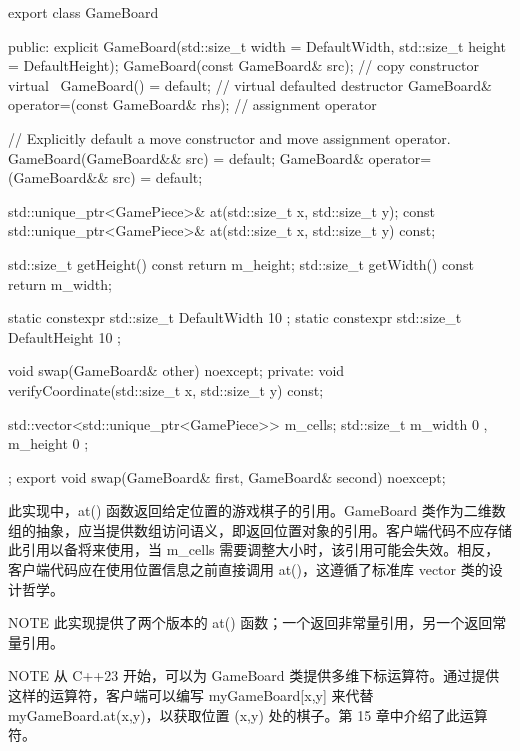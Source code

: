 \begin{cpp}
export class GameBoard
{
    public:
        explicit GameBoard(std::size_t width = DefaultWidth,
            std::size_t height = DefaultHeight);
        GameBoard(const GameBoard& src); // copy constructor
        virtual ~GameBoard() = default; // virtual defaulted destructor
        GameBoard& operator=(const GameBoard& rhs); // assignment operator

        // Explicitly default a move constructor and move assignment operator.
        GameBoard(GameBoard&& src) = default;
        GameBoard& operator=(GameBoard&& src) = default;

        std::unique_ptr<GamePiece>& at(std::size_t x, std::size_t y);
        const std::unique_ptr<GamePiece>& at(std::size_t x, std::size_t y) const;

        std::size_t getHeight() const { return m_height; }
        std::size_t getWidth() const { return m_width; }

        static constexpr std::size_t DefaultWidth { 10 };
        static constexpr std::size_t DefaultHeight { 10 };

        void swap(GameBoard& other) noexcept;
    private:
        void verifyCoordinate(std::size_t x, std::size_t y) const;

        std::vector<std::unique_ptr<GamePiece>> m_cells;
        std::size_t m_width { 0 }, m_height { 0 };
};
export void swap(GameBoard& first, GameBoard& second) noexcept;
\end{cpp}

此实现中，at() 函数返回给定位置的游戏棋子的引用。GameBoard 类作为二维数组的抽象，应当提供数组访问语义，即返回位置对象的引用。客户端代码不应存储此引用以备将来使用，当 m\_cells 需要调整大小时，该引用可能会失效。相反，客户端代码应在使用位置信息之前直接调用 at()，这遵循了标准库 vector 类的设计哲学。

\begin{myNotic}{NOTE}
此实现提供了两个版本的 at() 函数；一个返回非常量引用，另一个返回常量引用。
\end{myNotic}


\begin{myNotic}{NOTE}
从 C++23 开始，可以为 GameBoard 类提供多维下标运算符。通过提供这样的运算符，客户端可以编写 myGameBoard[x,y] 来代替 myGameBoard.at(x,y)，以获取位置 (x,y) 处的棋子。第 15 章中介绍了此运算符。
\end{myNotic}

